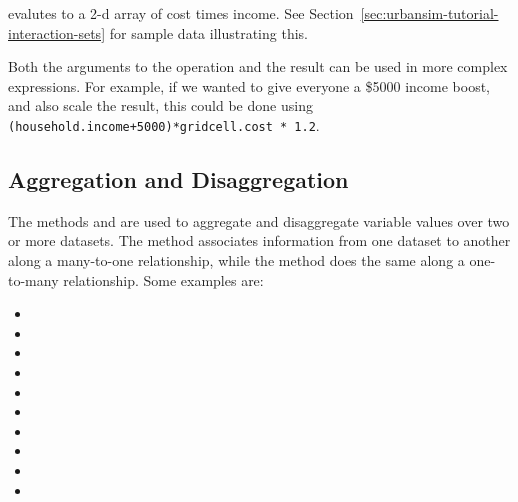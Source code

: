 evalutes to a 2-d array of cost times income.  See 
Section~\ref{sec:urbansim-tutorial-interaction-sets} for sample data illustrating this.

Both the arguments to the operation and the result can be used in more
complex expressions.  For example, if we wanted to give everyone
a \$5000 income boost, and also scale the result, this could be done using
\verb|(household.income+5000)*gridcell.cost * 1.2|.

\subsection{Aggregation and Disaggregation}
\label{sec:aggregation}
 

The methods  and  are used to
aggregate and disaggregate variable values over two or more datasets.  
  The  method associates
information from one dataset to another along a many-to-one relationship, while
the  method does the same along a one-to-many relationship. Some
examples are:

\begin{itemize}
\item {}

\item {}

\item {}

\item {}

\item {}

\item {}

\item {}

\item {}

\item {}

\item {}

\end{itemize}

